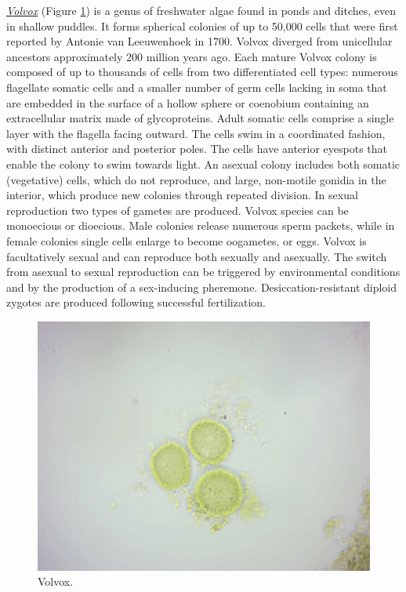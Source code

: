 \href{https://en.wikipedia.org/wiki/Volvox}{\emph{Volvox}} (Figure
\ref{fig:volvox}) is a genus of freshwater algae found in ponds and
ditches, even in shallow puddles. It forms spherical colonies of up to
50,000 cells that were first reported by Antonie van Leeuwenhoek in
1700. Volvox diverged from unicellular ancestors approximately 200
million years ago. Each mature Volvox colony is composed of up to
thousands of cells from two differentiated cell types: numerous
flagellate somatic cells and a smaller number of germ cells lacking in
soma that are embedded in the surface of a hollow sphere or coenobium
containing an extracellular matrix made of glycoproteins. Adult somatic
cells comprise a single layer with the flagella facing outward. The
cells swim in a coordinated fashion, with distinct anterior and
posterior poles. The cells have anterior eyespots that enable the colony
to swim towards light. An asexual colony includes both somatic
(vegetative) cells, which do not reproduce, and large, non-motile
gonidia in the interior, which produce new colonies through repeated
division. In sexual reproduction two types of gametes are produced.
Volvox species can be monoecious or dioecious. Male colonies release
numerous sperm packets, while in female colonies single cells enlarge to
become oogametes, or eggs. Volvox is facultatively sexual and can
reproduce both sexually and asexually. The switch from asexual to sexual
reproduction can be triggered by environmental conditions and by the
production of a sex-inducing pheremone. Desiccation-resistant diploid
zygotes are produced following successful fertilization.

\begin{figure}

{\centering \includegraphics[width=0.7\linewidth]{./figures/protists/Volvox} 

}

\caption{Volvox.}\label{fig:volvox}
\end{figure}

